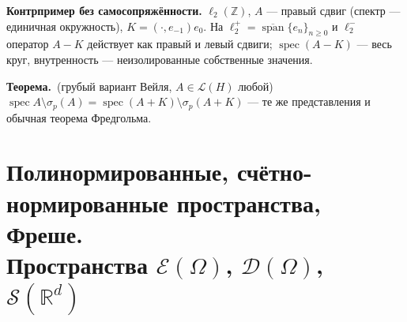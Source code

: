 \documentclass[11pt,a4paper]{article}
\newcommand{\Lc}{\mathcal L}
\newcommand{\RR}{\mathbb R}
\newcommand{\DD}{\mathcal D}
\newcommand{\EE}{\mathcal E}
\newcommand{\Sc}{\mathcal S}
\newcommand{\spec}{\operatorname{spec}}
\newcommand{\thm}{\textbf{Теорема.}~}
\begin{document}
\textbf{Контрпример без самосопряжённости.} $\ell_2(\mathbb Z)$, $A$ — правый сдвиг (спектр — единичная окружность), $K=(\cdot,e_{-1})e_0$. На $\ell_2^+=\overline{\operatorname{span}}\{e_n\}_{n\ge0}$ и $\ell_2^-$ оператор $A-K$ действует как правый и левый сдвиги; $\spec(A-K)$ — весь круг, внутренность — неизолированные собственные значения.

\thm (грубый вариант Вейля, $A\in\Lc(H)$ любой) $\spec A\setminus\sigma_p(A)=\spec(A+K)\setminus\sigma_p(A+K)$ — те же представления и обычная теорема Фредгольма.

\section[Полинормированные и счётно-нормированные пространства, Фреше. $\EE,\DD,\Sc$]{Полинормированные, счётно-нормированные пространства, Фреше.\\ Пространства $\EE(\Omega)$, $\DD(\Omega)$, $\Sc(\RR^d)$}
\end{document}
